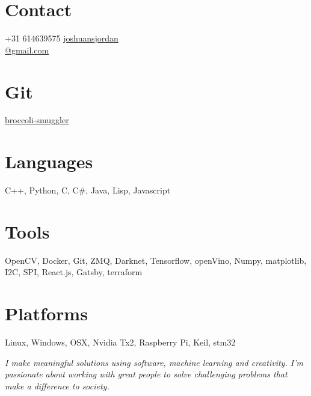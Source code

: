 \documentclass[print]{friggeri-cv} %
\begin{document}

\begin{aside} %
\section{Contact}
+31 614639575
\href{mailto:joshuansjordan@gmail.com}{joshuansjordan\\@gmail.com}
\section{Git}
\href{https://github.com/broccoli-smuggler}{broccoli-smuggler}
\section{Languages}
C++, Python, C, C\#, Java, Lisp, Javascript
\section{Tools}
OpenCV, Docker, Git, ZMQ, Darknet, Tensorflow, openVino, Numpy, matplotlib, I2C, SPI, React.js, Gatsby, terraform
\section{Platforms}
Linux, Windows, OSX, Nvidia Tx2, Raspberry Pi, Keil, stm32
\end{aside}

\emph{I make meaningful solutions using software, machine learning and creativity. I'm passionate about working with great people to solve challenging problems that make a difference to society.}
\end{document}
